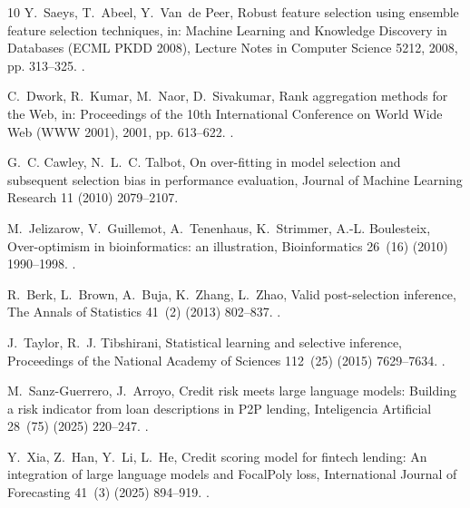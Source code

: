 \documentclass[final,5p,twocolumn]{elsarticle}
\begin{document}
\begin{thebibliography}{10}
Y.~Saeys, T.~Abeel, Y.~Van~de Peer, Robust feature selection using ensemble
  feature selection techniques, in: Machine Learning and Knowledge Discovery in
  Databases (ECML PKDD 2008), Lecture Notes in Computer Science 5212, 2008, pp.
  313--325.
\newblock \href {https://doi.org/10.1007/978-3-540-87481-2_21}
  {}.

C.~Dwork, R.~Kumar, M.~Naor, D.~Sivakumar, Rank aggregation methods for the
  {W}eb, in: Proceedings of the 10th International Conference on World Wide Web
  (WWW 2001), 2001, pp. 613--622.
\newblock \href {https://doi.org/10.1145/371920.372165}
  {}.

G.~C. Cawley, N.~L.~C. Talbot, On over-fitting in model selection and subsequent
  selection bias in performance evaluation, Journal of Machine Learning Research
  11 (2010) 2079--2107.

M.~Jelizarow, V.~Guillemot, A.~Tenenhaus, K.~Strimmer, A.-L. Boulesteix,
  Over-optimism in bioinformatics: an illustration, Bioinformatics 26~(16)
  (2010) 1990--1998.
\newblock \href {https://doi.org/10.1093/bioinformatics/btq323}
  {}.

R.~Berk, L.~Brown, A.~Buja, K.~Zhang, L.~Zhao, Valid post-selection inference,
  The Annals of Statistics 41~(2) (2013) 802--837.
\newblock \href {https://doi.org/10.1214/12-AOS1077}
  {}.

J.~Taylor, R.~J. Tibshirani, Statistical learning and selective inference,
  Proceedings of the National Academy of Sciences 112~(25) (2015) 7629--7634.
\newblock \href {https://doi.org/10.1073/pnas.1507583112}
  {}.

M.~Sanz-Guerrero, J.~Arroyo, Credit risk meets large language models: Building
  a risk indicator from loan descriptions in {P2P} lending, Inteligencia
  Artificial 28~(75) (2025) 220--247.
\newblock \href {https://doi.org/10.4114/intartif.vol28iss75pp220-247}
  {}.

Y.~Xia, Z.~Han, Y.~Li, L.~He, Credit scoring model for fintech lending: An
  integration of large language models and {FocalPoly} loss, International
  Journal of Forecasting 41~(3) (2025) 894--919.
\newblock \href {https://doi.org/10.1016/j.ijforecast.2024.07.005}
  {}.


\end{thebibliography}
\end{document}
